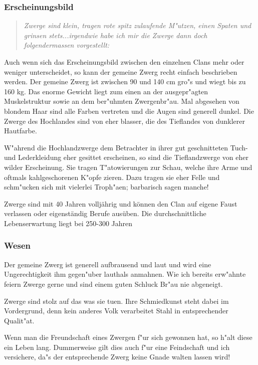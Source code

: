 \subsubsection{Erscheinungsbild}
\begin{quotation}
\par \textit{Zwerge sind klein, tragen rote spitz zulaufende M"utzen, einen Spaten und grinsen stets...irgendwie habe ich mir die Zwerge dann doch folgendermassen vorgestellt:}
\end{quotation}
\par Auch wenn sich das Erscheinungsbild zwischen den einzelnen Clans mehr oder weniger unterscheidet, so kann der gemeine Zwerg recht einfach beschrieben werden. Der gemeine Zwerg ist zwischen 90 und 140 cm gro"s und wiegt bis zu 160 kg. Das enorme Gewicht liegt zum einen an der ausgepr"agten Muskelstruktur sowie an dem ber"uhmten Zwergenbr"au. Mal abgesehen von blondem Haar sind alle Farben vertreten und die Augen sind generell dunkel. Die Zwerge des Hochlandes sind von eher blasser, die des Tieflandes von dunklerer Hautfarbe.
\par W"ahrend die Hochlandzwerge dem Betrachter in ihrer gut geschnitteten Tuch- und Lederkleidung eher gesittet erscheinen, so sind die Tieflandzwerge von eher wilder Erscheinung. Sie tragen T"atowierungen zur Schau, welche ihre Arme und oftmals kahlgeschorenen K"opfe zieren. Dazu tragen sie eher Felle und schm"ucken sich mit vielerlei Troph"aen; barbarisch sagen manche!
\par Zwerge sind mit 40 Jahren volljährig und können den Clan auf eigene Faust verlassen oder eigenständig Berufe ausüben. Die durchschnittliche Lebenserwartung liegt bei 250-300 Jahren
\subsubsection{Wesen}
\par Der gemeine Zwerg ist generell aufbrausend und laut und wird eine Ungerechtigkeit ihm gegen"uber lauthals anmahnen. Wie ich bereits erw"ahnte feiern Zwerge gerne und sind einem guten Schluck Br"au nie abgeneigt.
\par Zwerge sind stolz auf das was sie tuen. Ihre Schmiedkunst steht dabei im Vordergrund, denn kein anderes Volk verarbeitet Stahl in entsprechender Qualit"at.
\par Wenn man die Freundschaft eines Zwergen f"ur sich gewonnen hat, so h"alt diese ein Leben lang. Dummerweise gilt dies auch f"ur eine Feindschaft und ich versichere, da"s der entsprechende Zwerg keine Gnade walten lassen wird!
